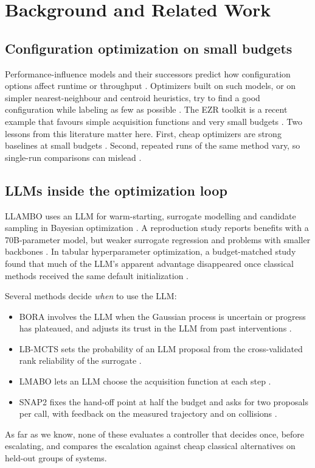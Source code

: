 \section{Background and Related Work}

\subsection{Configuration optimization on small budgets}

Performance-influence models and their successors predict how configuration options affect runtime or throughput \cite{siegmund2015influence,ha2019deepperf}. Optimizers built on such models, or on simpler nearest-neighbour and centroid heuristics, try to find a good configuration while labeling as few as possible \cite{nair2020flash,menzies2026ezr}. The EZR toolkit is a recent example that favours simple acquisition functions and very small budgets \cite{menzies2026ezr}. Two lessons from this literature matter here. First, cheap optimizers are strong baselines at small budgets \cite{ganguly2026tournament}. Second, repeated runs of the same method vary, so single-run comparisons can mislead \cite{rayegan2026instability}.

\subsection{LLMs inside the optimization loop}

LLAMBO uses an LLM for warm-starting, surrogate modelling and candidate sampling in Bayesian optimization \cite{liu2024llambo}. A reproduction study reports benefits with a 70B-parameter model, but weaker surrogate regression and problems with smaller backbones \cite{rychert2025reproduction}. In tabular hyperparameter optimization, a budget-matched study found that much of the LLM's apparent advantage disappeared once classical methods received the same default initialization \cite{rodrigues2026worth}.

Several methods decide \emph{when} to use the LLM:
\begin{itemize}
  \item BORA involves the LLM when the Gaussian process is uncertain or progress has plateaued, and adjusts its trust in the LLM from past interventions \cite{cisse2025bora}.
  \item LB-MCTS sets the probability of an LLM proposal from the cross-validated rank reliability of the surrogate \cite{xu2026lbmcts}.
  \item LMABO lets an LLM choose the acquisition function at each step \cite{ngo2026lmabo}.
  \item SNAP2 fixes the hand-off point at half the budget and asks for two proposals per call, with feedback on the measured trajectory and on collisions \cite{srinivasan2026snap2}.
\end{itemize}
As far as we know, none of these evaluates a controller that decides once, before escalating, and compares the escalation against cheap classical alternatives on held-out groups of systems.

